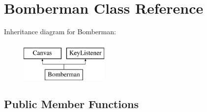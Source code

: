 \hypertarget{class_bomberman}{}\section{Bomberman Class Reference}
\label{class_bomberman}
Inheritance diagram for Bomberman\+:\begin{figure}[H]
\begin{center}
\leavevmode
\includegraphics[height=2.000000cm]{class_bomberman}
\end{center}
\end{figure}
\subsection*{Public Member Functions}
